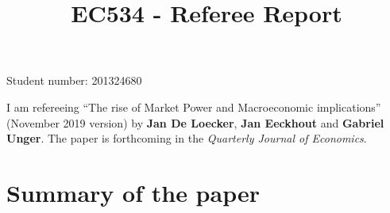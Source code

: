 \documentclass{amsart}
\theoremstyle{definition}
\theoremstyle{remark}
\numberwithin{equation}{section}
\begin{document}
\title{EC534 - Referee Report}

\author{}







\maketitle

\begin{center}
Student number: 201324680
\end{center}


\vspace{12pt}

I am refereeing ``The rise of Market Power and Macroeconomic implications'' (November 2019 version) by \textbf{Jan De Loecker}, \textbf{Jan Eeckhout} and \textbf{Gabriel Unger}. The paper is forthcoming in the \textit{Quarterly Journal of Economics}.

\newpage 

\section*{Summary of the paper}
\end{document}

